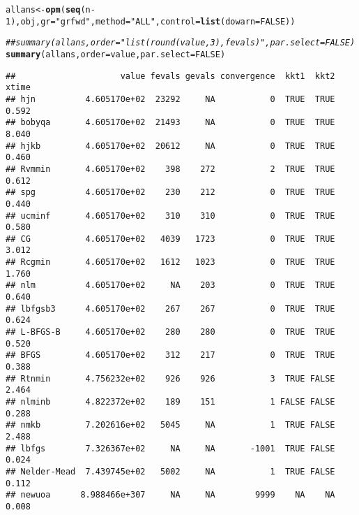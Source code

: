\documentclass[11pt]{article}\usepackage[]{graphicx}\usepackage[]{color}
\makeatletter
\newcommand{\hlnum}[1]{\textcolor[rgb]{0.686,0.059,0.569}{#1}}%
\newcommand{\hlstr}[1]{\textcolor[rgb]{0.192,0.494,0.8}{#1}}%
\newcommand{\hlcom}[1]{\textcolor[rgb]{0.678,0.584,0.686}{\textit{#1}}}%
\newcommand{\hlopt}[1]{\textcolor[rgb]{0,0,0}{#1}}%
\newcommand{\hlstd}[1]{\textcolor[rgb]{0.345,0.345,0.345}{#1}}%
\newcommand{\hlkwb}[1]{\textcolor[rgb]{0.69,0.353,0.396}{#1}}%
\newcommand{\hlkwc}[1]{\textcolor[rgb]{0.333,0.667,0.333}{#1}}%
\newcommand{\hlkwd}[1]{\textcolor[rgb]{0.737,0.353,0.396}{\textbf{#1}}}%
\newenvironment{kframe}{%
 \def\at@end@of@kframe{}%
 \ifinner\ifhmode%
  \def\at@end@of@kframe{\end{minipage}}%
  \begin{minipage}{\columnwidth}%
 \fi\fi%
 \def\FrameCommand##1{\hskip\@totalleftmargin \hskip-\fboxsep
 \colorbox{shadecolor}{##1}\hskip-\fboxsep
     \hskip-\linewidth \hskip-\@totalleftmargin \hskip\columnwidth}%
 \MakeFramed {\advance\hsize-\width
   \@totalleftmargin\z@ \linewidth\hsize
   \@setminipage}}%
 {\par\unskip\endMakeFramed%
 \at@end@of@kframe}
\newenvironment{knitrout}{}{} %
\makeatother
\begin{document}
\begin{knitrout}\scriptsize
{}\color{fgcolor}\begin{kframe}
\begin{alltt}
\hlstd{allans}\hlkwb{<-} \hlkwd{opm}\hlstd{(}\hlkwd{seq}\hlstd{(n}\hlopt{-}\hlnum{1}\hlstd{), obj,} \hlkwc{gr}\hlstd{=}\hlstr{"grfwd"}\hlstd{,} \hlkwc{method}\hlstd{=}\hlstr{"ALL"}\hlstd{,} \hlkwc{control}\hlstd{=}\hlkwd{list}\hlstd{(}\hlkwc{dowarn}\hlstd{=}\hlnum{FALSE}\hlstd{))}
\end{alltt}


{\ttfamily\noindent{}}

{\ttfamily\noindent{}}

{\ttfamily\noindent\color{warningcolor}{\#\# Warning in nmk(par = spar, fn = efn, control = mcontrol, ...): Nelder-Mead should not be used for high-dimensional optimization}}

{\ttfamily\noindent\color{warningcolor}{\#\# Warning in optimr(par, fn, gr, method = meth, lower = lower, upper = upper, : Maximum number of fevals exceeded\ \ Restarts for stagnation =0}}\begin{alltt}
\hlcom{## summary(allans, order = "list(round(value, 3), fevals)", par.select = FALSE)}
\hlkwd{summary}\hlstd{(allans,} \hlkwc{order} \hlstd{= value,} \hlkwc{par.select} \hlstd{=} \hlnum{FALSE}\hlstd{)}
\end{alltt}
\begin{verbatim}
##                     value fevals gevals convergence  kkt1  kkt2 xtime
## hjn          4.605170e+02  23292     NA           0  TRUE  TRUE 0.592
## bobyqa       4.605170e+02  21493     NA           0  TRUE  TRUE 8.040
## hjkb         4.605170e+02  20612     NA           0  TRUE  TRUE 0.460
## Rvmmin       4.605170e+02    398    272           2  TRUE  TRUE 0.612
## spg          4.605170e+02    230    212           0  TRUE  TRUE 0.440
## ucminf       4.605170e+02    310    310           0  TRUE  TRUE 0.580
## CG           4.605170e+02   4039   1723           0  TRUE  TRUE 3.012
## Rcgmin       4.605170e+02   1612   1023           0  TRUE  TRUE 1.760
## nlm          4.605170e+02     NA    203           0  TRUE  TRUE 0.640
## lbfgsb3      4.605170e+02    267    267           0  TRUE  TRUE 0.624
## L-BFGS-B     4.605170e+02    280    280           0  TRUE  TRUE 0.520
## BFGS         4.605170e+02    312    217           0  TRUE  TRUE 0.388
## Rtnmin       4.756232e+02    926    926           3  TRUE FALSE 2.464
## nlminb       4.822372e+02    189    151           1 FALSE FALSE 0.288
## nmkb         7.202616e+02   5045     NA           1  TRUE FALSE 2.488
## lbfgs        7.326367e+02     NA     NA       -1001  TRUE FALSE 0.024
## Nelder-Mead  7.439745e+02   5002     NA           1  TRUE FALSE 0.112
## newuoa      8.988466e+307     NA     NA        9999    NA    NA 0.008
\end{verbatim}
\end{kframe}
\end{knitrout}
\end{document}
